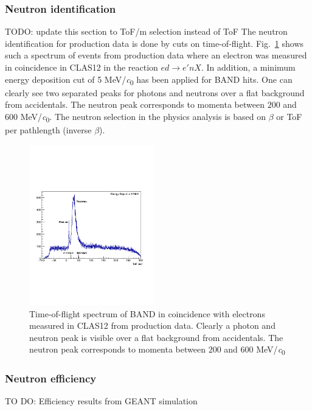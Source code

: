 \documentclass[3p,final,twocolumn]{elsarticle}
\begin{document}
{\subsubsection{Neutron identification}
{\color{red}  TODO: update this section to ToF/m selection instead of ToF}
The neutron identification for production data is done by cuts on time-of-flight. Fig.~\ref{fig:tof} shows such a spectrum of events from production data where an electron was measured in coincidence in CLAS12 in the reaction $ed \rightarrow e'nX$. In addition, a minimum energy deposition cut of 5 \si{\MeV/\clight} has been applied for BAND hits. One can clearly see two separated peaks for photons and neutrons over a flat background from accidentals. The neutron peak corresponds to momenta between $200$ and $600$ \si{\MeV/\clight}.
The neutron selection in the physics analysis is based on $\beta$ or ToF per pathlength (inverse $\beta$).

\begin{figure}[h!]
	\centering
		\includegraphics[width=0.48\textwidth]{tof-labels.pdf}
	\caption{Time-of-flight spectrum of BAND in coincidence with electrons measured in CLAS12 from production data. Clearly a photon and neutron peak is visible over a flat background from accidentals. The neutron peak corresponds to momenta  between $200$ and $600$ \si{\MeV/\clight}}
	\label{fig:tof}
\end{figure}

\subsubsection{Neutron efficiency}
TO DO: Efficiency results from GEANT simulation



}
\end{document}
